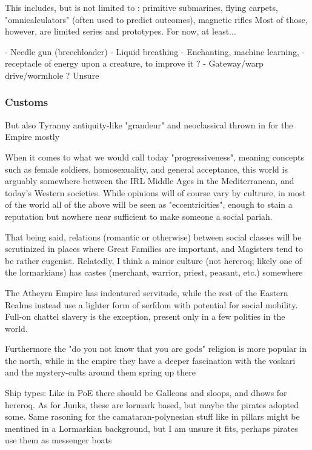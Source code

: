 This includes, but is not limited to : primitive submarines, flying carpets, "omnicalculators" (often used to predict outcomes), magnetic rifles
Most of those, however, are limited series and prototypes. For now, at least...


- Needle gun (breechloader)
- Liquid breathing
- Enchanting, machine learning, 
- receptacle of energy upon a creature, to improve it ?
- Gateway/warp drive/wormhole ? Unsure


\subsubsection{Customs}

But also Tyranny antiquity-like "grandeur" and neoclassical thrown in for the Empire mostly

When it comes to what we would call today "progressiveness", meaning concepts such as female soldiers, homosexuality, and general acceptance, this world is arguably somewhere between the IRL Middle Ages in the Mediterranean, and today's Western societies. While opinions will of course vary by cultrure, in most of the world all of the above will be seen as "eccentricities", enough to stain a reputation but nowhere near sufficient to make someone a social pariah.

That being said, relations (romantic or otherwise) between social classes will be scrutinized in places where Great Families are important, and Magisters tend to be rather eugenist. 
Relatedly, I think a minor culture (not hereroq; likely one of the lormarkians) has castes (merchant, warrior, priest, peasant, etc.) somewhere

The Atheyrn Empire has indentured servitude, while the rest of the Eastern Realms instead use a lighter form of serfdom with potential for social mobility. Full-on chattel slavery is the exception, present only in a few polities in the world.

Furthermore the "do you not know that you are gods" religion is more popular in the north, while in the empire they have a deeper fascination with the voskari and the mystery-cults around them spring up there







Ship types:
	Like in PoE there should be Galleons and sloops, and dhows for hereroq.
	As for Junks, these are lormark based, but maybe the pirates adopted some. Same rasoning for the camataran-polynesian stuff like in pillars might be mentined in a Lormarkian background, but I am unsure it fits, perhaps pirates use them as messenger boats





